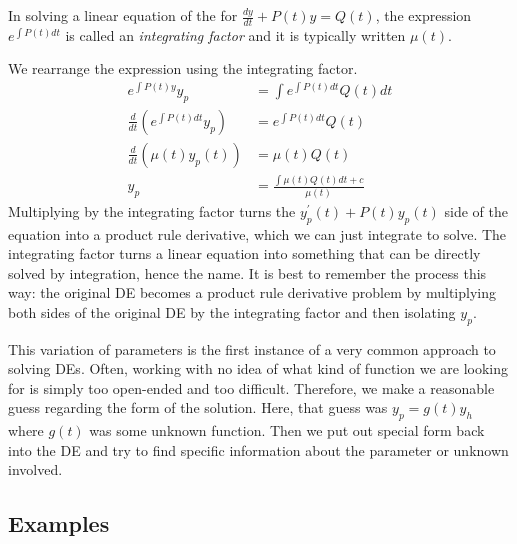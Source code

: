 \documentclass[fleqn,letterpaper]{report}
\begin{document}
\begin{defn}
In solving a linear equation of the for $\frac{dy}{dt} + P(t)
y = Q(t)$, the expression $e^{\int P(t) dt}$ is called an
\emph{integrating factor} and it is typically written
$\mu(t)$. 
\end{defn}

We rearrange the expression using the integrating factor.
\begin{align*}
e^{\int P(t) y} y_p & = \int e^{\int P(t) dt} Q(t) dt \\
\frac{d}{dt} \left( e^{\int P(t) dt} y_p \right) & = e^{\int P(t)
dt} Q(t) \\
\frac{d}{dt} (\mu (t) y_p(t)) & = \mu (t) Q(t) \\
y_p & = \frac{\int \mu(t) Q(t) dt + c}{\mu (t)} 
\end{align*}
Multiplying by the integrating factor turns the $y_p^\prime(t)
+ P(t) y_p(t)$ side of the equation into a product rule
derivative, which we can just integrate to solve. The
integrating factor turns a linear equation into something that
can be directly solved by integration, hence the name. It is
best to remember the process this way: the original
DE becomes a product rule derivative problem by multiplying
both sides of the original DE by the integrating factor and
then isolating $y_p$. 

This variation of parameters is the first instance of a very
common approach to solving DEs. Often, working with no idea of
what kind of function we are looking for is simply too
open-ended and too difficult. Therefore, we make a reasonable
guess regarding the form of the solution. Here, that guess was
$y_p = g(t) y_h$ where $g(t)$ was some unknown function. Then
we put out special form back into the DE and try to find
specific information about the parameter or unknown
involved.

\subsection{Examples}
\label{linear-equations-examples}
\end{document}
